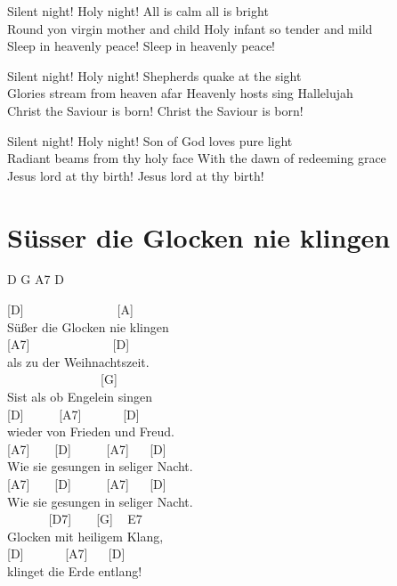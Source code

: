 \documentclass[
  letterpaper,
  twoside=false]{scrbook}
\begin{document}
Silent night! Holy night! All is calm all is bright\\
Round yon virgin mother and child Holy infant so tender and mild\\
Sleep in heavenly peace! Sleep in heavenly peace!

Silent night! Holy night! Shepherds quake at the sight\\
Glories stream from heaven afar Heavenly hosts sing Hallelujah\\
Christ the Saviour is born! Christ the Saviour is born!

Silent night! Holy night! Son of God love\textquotesingle s pure light\\
Radiant beams from thy holy face With the dawn of redeeming grace\\
Jesus lord at thy birth! Jesus lord at thy birth!

\hypertarget{suxfcsser-die-glocken-nie-klingen}{%
\chapter{Süsser die Glocken nie
klingen}\label{suxfcsser-die-glocken-nie-klingen}}

D G A7 D

{[}D{]} ~ ~ ~ ~ ~ ~ ~ ~ ~{[}A{]}\\
Süßer die Glocken nie klingen\\
{[}A7{]} ~ ~ ~ ~ ~ ~ ~ ~{[}D{]}\\
als zu der Weihnachtszeit.\\
\hspace*{0.333em} ~ ~ ~ ~ ~ ~ ~ ~ ~ {[}G{]}\\
S\textquotesingle ist als ob Engelein singen\\
{[}D{]} ~ ~ ~ {[}A7{]} ~ ~ ~ ~{[}D{]}\\
wieder von Frieden und Freud\textquotesingle.\\
{[}A7{]} ~ ~ {[}D{]} ~ ~ ~ {[}A7{]} ~ ~{[}D{]}\\
Wie sie gesungen in seliger Nacht.\\
{[}A7{]} ~ ~ {[}D{]} ~ ~ ~ {[}A7{]} ~ ~{[}D{]}\\
Wie sie gesungen in seliger Nacht.\\
\hspace*{0.333em} ~ ~ ~ ~ {[}D7{]} ~ ~ {[}G{]} ~ E7\\
Glocken mit heiligem Klang,\\
{[}D{]} ~ ~ ~ ~{[}A7{]} ~ ~{[}D{]}\\
klinget die Erde entlang!
\end{document}
